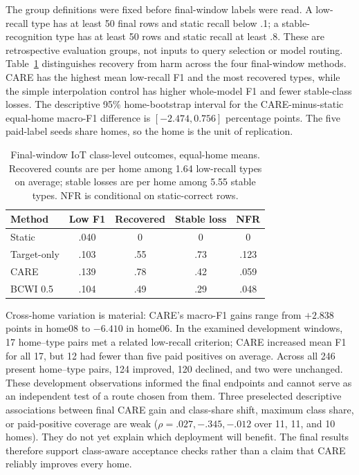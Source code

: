 \documentclass[journal]{IEEEtran}
\begin{document}
The group definitions were fixed before final-window labels were read. A low-recall type has at least 50 final rows and static recall below .1; a stable-recognition type has at least 50 rows and static recall at least .8. These are retrospective evaluation groups, not inputs to query selection or model routing. Table~\ref{tab:iotgroups} distinguishes recovery from harm across the four final-window methods. CARE has the highest mean low-recall F1 and the most recovered types, while the simple interpolation control has higher whole-model F1 and fewer stable-class losses. The descriptive 95\% home-bootstrap interval for the CARE-minus-static equal-home macro-F1 difference is $[-2.474,0.756]$ percentage points. The five paid-label seeds share homes, so the home is the unit of replication.

\begin{table}[!t]
\centering
\caption{Final-window IoT class-level outcomes, equal-home means. Recovered counts are per home among 1.64 low-recall types on average; stable losses are per home among 5.55 stable types. NFR is conditional on static-correct rows.}
\label{tab:iotgroups}
\scriptsize
\setlength{\tabcolsep}{3pt}
\begin{tabular}{@{}lcccc@{}}
\toprule
Method & Low F1 & Recovered & Stable loss & NFR\\
\midrule
Static & .040 & 0 & 0 & 0\\
Target-only & .103 & .55 & .73 & .123\\
CARE & .139 & .78 & .42 & .059\\
BCWI 0.5 & .104 & .49 & .29 & .048\\
\bottomrule
\end{tabular}
\end{table}

Cross-home variation is material: CARE's macro-F1 gains range from $+2.838$ points in home08 to $-6.410$ in home06. In the examined development windows, 17 home--type pairs met a related low-recall criterion; CARE increased mean F1 for all 17, but 12 had fewer than five paid positives on average. Across all 246 present home--type pairs, 124 improved, 120 declined, and two were unchanged. These development observations informed the final endpoints and cannot serve as an independent test of a route chosen from them. Three preselected descriptive associations between final CARE gain and class-share shift, maximum class share, or paid-positive coverage are weak ($\rho=.027,-.345,-.012$ over 11, 11, and 10 homes). They do not yet explain which deployment will benefit. The final results therefore support class-aware acceptance checks rather than a claim that CARE reliably improves every home.
\end{document}
